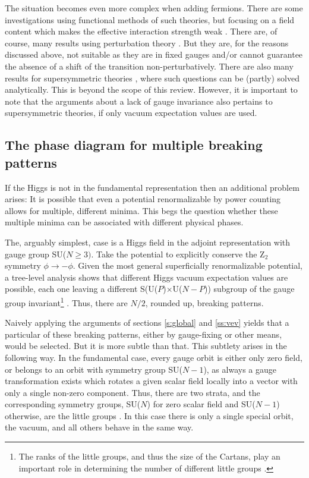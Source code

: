 \documentclass[final,12pt]{article}
\newcommand*{\1}{1\!\!\!\bot}
\begin{document}
The situation becomes even more complex when adding fermions. There are some investigations using functional methods of such theories, but focusing on a field content which makes the effective interaction strength weak \cite{Litim:2014uca,Litim:2015iea}. There are, of course, many results using perturbation theory \cite{Kapusta:2006pm,Branco:2011iw,Ivanov:2017dad}. But they are, for the reasons discussed above, not suitable as they are in fixed gauges and/or cannot guarantee the absence of a shift of the transition non-perturbatively. There are also many results for supersymmetric theories \cite{Weinberg:2000cr}, where such questions can be (partly) solved analytically. This is beyond the scope of this review. However, it is important to note that the arguments about a lack of gauge invariance also pertains to supersymmetric theories, if only vacuum expectation values are used.

\subsection{The phase diagram for multiple breaking patterns}\label{ss:strata}

If the Higgs is not in the fundamental representation then an additional problem arises: It is possible that even a potential renormalizable by power counting allows for multiple, different minima. This begs the question whether these multiple minima can be associated with different physical phases.

The, arguably simplest, case is a Higgs field in the adjoint representation with gauge group SU($N\ge 3)$. Take the potential to explicitly conserve the Z$_2$ symmetry $\phi\to-\phi$. Given the most general superficially renormalizable potential, a tree-level analysis shows that different Higgs vacuum expectation values are possible, each one leaving a different S(U($P$)$\times$U($N-P$)) subgroup of the gauge group invariant\footnote{The ranks of the little groups, and thus the size of the Cartans, play an important role in determining the number of different little groups \cite{O'Raifeartaigh:1986vq}.} \cite{Li:1973mq,Ruegg:1980gf,Murphy:1983rf,Maas:2017xzh}. Thus, there are $N/2$, rounded up, breaking patterns.

Naively applying the arguments of sections \ref{s:global} and \ref{ss:vev} yields that a particular of these breaking patterns, either by gauge-fixing or other means, would be selected. But it is more subtle than that. This subtlety arises in the following way. In the fundamental case, every gauge orbit is either only zero field, or belongs to an orbit with symmetry group SU($N-1$), as always a gauge transformation exists which rotates a given scalar field locally into a vector with only a single non-zero component. Thus, there are two strata, and the corresponding symmetry groups, SU($N$) for zero scalar field and SU($N-1$) otherwise, are the little groups \cite{O'Raifeartaigh:1986vq}. In this case there is only a single special orbit, the vacuum, and all others behave in the same way.
\end{document}
